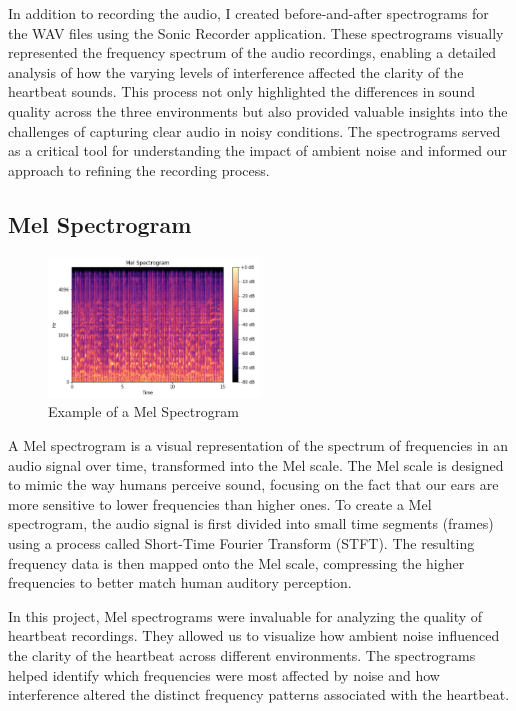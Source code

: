 \documentclass[conference]{IEEEtran}
\begin{document}
In addition to recording the audio, I created before-and-after spectrograms for the WAV files using the Sonic Recorder application. These spectrograms visually represented the frequency spectrum of the audio recordings, enabling a detailed analysis of how the varying levels of interference affected the clarity of the heartbeat sounds. This process not only highlighted the differences in sound quality across the three environments but also provided valuable insights into the challenges of capturing clear audio in noisy conditions. The spectrograms served as a critical tool for understanding the impact of ambient noise and informed our approach to refining the recording process.


\subsection{Mel Spectrogram}

\begin{figure}
    \centering
    \includegraphics[width=0.5\textwidth]{Images/Melspectrogram.png}
    \caption{Example of a Mel Spectrogram}
    \label{fig:mel_spectrogram}
\end{figure}

A Mel spectrogram is a visual representation of the spectrum of frequencies in an audio signal over time, transformed into the Mel scale. The Mel scale is designed to mimic the way humans perceive sound, focusing on the fact that our ears are more sensitive to lower frequencies than higher ones. To create a Mel spectrogram, the audio signal is first divided into small time segments (frames) using a process called Short-Time Fourier Transform (STFT). The resulting frequency data is then mapped onto the Mel scale, compressing the higher frequencies to better match human auditory perception.

In this project, Mel spectrograms were invaluable for analyzing the quality of heartbeat recordings. They allowed us to visualize how ambient noise influenced the clarity of the heartbeat across different environments. The spectrograms helped identify which frequencies were most affected by noise and how interference altered the distinct frequency patterns associated with the heartbeat.
\end{document}
